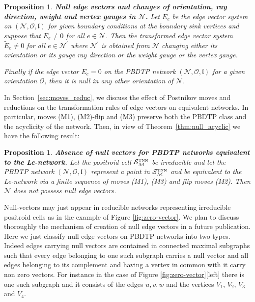\documentclass[11pt]{amsart}
\theoremstyle{plain}
\numberwithin{equation}{section}
\newtheorem{proposition}[theorem]{Proposition}
\def \S {{\mathcal S}_{\mathcal M}^{\mbox{\tiny TNN}}}
\begin{document}
\begin{proposition}\label{prop:null_vectors}\textbf{Null edge vectors and changes of orientation, ray direction, weight and vertex gauges in $\mathcal N$.}
Let $E_e$ be the edge vector system on $({\mathcal N}, {\mathcal O}, \mathfrak{l})$ for given boundary conditions at the boundary sink vertices and suppose that $E_e\not =0$ for all $e\in {\mathcal N}$. Then the transformed edge vector system ${\tilde E}_e\not =0$ for all $e\in {\mathcal N}^{\prime}$ where  ${\mathcal N}^{\prime}$ is obtained from ${\mathcal N}$ changing either its orientation or its gauge ray direction or the weight gauge or the vertex gauge. 

Finally if the edge vector $E_e=0$ on the PBDTP network $({\mathcal N}, \mathcal O, \mathfrak l)$ for a given orientation $\mathcal O$, then it is null in any other orientation of ${\mathcal N}$.
\end{proposition}

In Section~\ref{sec:moves_reduc}, we discuss the effect of Postnikov moves and reductions on the transformation rules of edge vectors on equivalent networks. In particular, moves (M1), (M2)-flip and (M3) preserve both the PBDTP class and the acyclicity of the network. Then, in view of Theorem~\ref{thm:null_acyclic} we have the following result:

\begin{proposition}\label{prop:Le_net}\textbf{Absence of null vectors for PBDTP networks equivalent to the Le-network.}
Let the positroid cell $\S$ be irreducible and let the PBDTP network  $({\mathcal N},{\mathcal O},\mathfrak l)$ represent a point in  $\S$ and be equivalent to the Le-network via a finite sequence of moves (M1), (M3) and flip moves (M2). Then ${\mathcal N}$ does not possess null edge vectors.
\end{proposition}

Null-vectors may just appear in reducible networks representing irreducible positroid cells as in the example of Figure \ref{fig:zero-vector}. We plan to discuss thoroughly the mechanism of creation of null edge vectors in a future publication.
Here we just classify null edge vectors on PBDTP networks into two types.
Indeed edges carrying null vectors are contained in connected maximal subgraphs such that every edge belonging to one such subgraph carries a null vector and all edges belonging to its complement and having a vertex in common with it carry non zero vectors. For instance in the case of Figure \ref{fig:zero-vector}[left] there is one such subgraph and it consists of the edges $u,v,w$ and the vertices $V_1$, $V_2$, $V_3$ and $V_4$.
\end{document}
